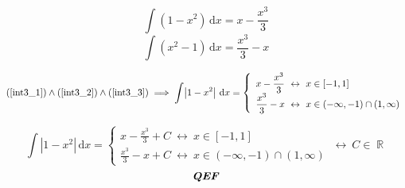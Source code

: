 \documentclass[12pt]{article}
\newcommand{\for}{\ \leftrightarrow\ }
\newcommand{\Integral}[2]{\int \! #1 \, \mathrm{d}#2}
\newcommand{\qef}{\textbf{\textit{QEF}}}
\let\oldref\ref
\renewcommand{\ref}[1]{(\oldref{#1})}
\DeclareMathOperator{\R}{\mathbb{R}}
\begin{document}
\begin{equation} \label{int3_2}
    \Integral{(1 - x^2)}{x} = x - \frac{x^3}{3}
\end{equation}
\begin{equation} \label{int3_3}
    \Integral{(x^2 - 1)}{x} = \frac{x^3}{3} - x
\end{equation}

$$
\ref{int3_1} \land \ref{int3_2} \land \ref{int3_3} \implies
\Integral{\left| 1-x^2 \right|}{x} =
    \left\{ \begin{array}{l}
        \displaystyle x - \frac{x^3}{3} \for x \in [-1,1] \\
        \displaystyle \frac{x^3}{3} - x \for x \in (-\infty,-1)\cap(1,\infty)
    \end{array} \right.
$$

$$
\Integral{\left| 1-x^2 \right|}{x} =
    \left\{ \begin{array}{l}
        \displaystyle x - \frac{x^3}{3} + C \for x \in [-1,1] \\
        \displaystyle \frac{x^3}{3} - x + C \for x \in (-\infty,-1)\cap(1,\infty)
    \end{array} \right. \for C \in \R
$$
$$ \qef $$
\end{document}
